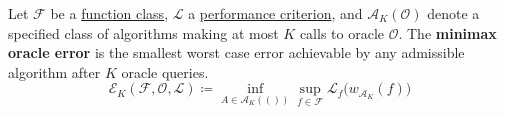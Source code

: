 \begin{definition}
  \label{def:minimax-oracle-error}
	Let $\mathcal{F}$ be a \hyperref[def:function-class]{function class}, $\mathcal{L}$ a \hyperref[def:performance-criterion]{performance criterion}, and $\mathcal{A}_K (\mathcal{O})$ denote a specified class of algorithms making at most $K$ calls to oracle $\mathcal{O}$. The \textbf{minimax oracle error} is the smallest worst case error achievable by any admissible algorithm after $K$ oracle queries. 
	\begin{equation}
		\mathcal{E}_K (\mathcal{F}, \mathcal{O}, \mathcal{L}) \coloneq \inf_{A \in \mathcal{A}_K (\mathcal{()})} \sup_{f \in \mathcal{F}} \mathcal{L}_f \big(w_{\mathcal{A}_K} (f) \big)
	\end{equation}
\end{definition}


%
%
%
%
%

